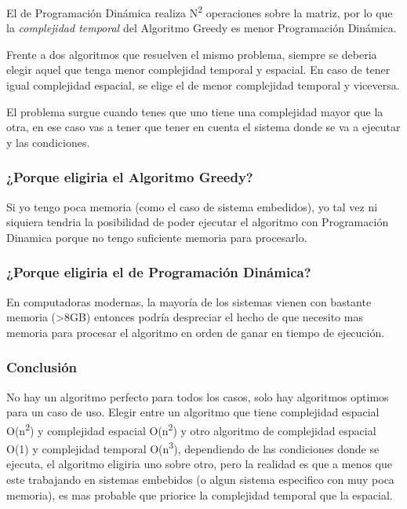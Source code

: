 \documentclass[titlepage,a4paper]{article}
\begin{document}
El de Programación Dinámica realiza N\textsuperscript{2} operaciones sobre la matriz, por lo que
la \emph{complejidad temporal} del Algoritmo Greedy es menor Programación Dinámica.

Frente a dos algoritmos que resuelven el mismo problema, siempre se deberia
elegir aquel que tenga menor complejidad temporal y espacial. En caso de tener
igual complejidad espacial, se elige el de menor complejidad temporal y
viceversa.

El problema surgue cuando tenes que uno tiene una complejidad mayor que la otra,
en ese caso vas a tener que tener en cuenta el sistema donde se va a ejecutar y
las condiciones.

\subsubsection{¿Porque eligiria el Algoritmo Greedy?}
\label{sec:org17f62a5}
Si yo tengo poca memoria (como el caso de sistema embedidos), yo tal vez ni
siquiera tendria la posibilidad de poder ejecutar el algoritmo con Programación
Dinamica porque no tengo suficiente memoria para procesarlo.

\subsubsection{¿Porque eligiria el de Programación Dinámica?}
\label{sec:org1213c1f}
En computadoras modernas, la mayoría de los sistemas vienen con bastante memoria
(>8GB) entonces podría despreciar el hecho de que necesito mas memoria para
procesar el algoritmo en orden de ganar en tiempo de ejecución.

\subsubsection{Conclusión}
\label{sec:orga19eebd}
No hay un algoritmo perfecto para todos los casos, solo hay algoritmos optimos
para un caso de uso. Elegir entre un algoritmo que tiene complejidad espacial
O(n\textsuperscript{2}) y complejidad espacial O(n\textsuperscript{2}) y otro algoritmo de complejidad espacial
O(1) y complejidad temporal O(n\textsuperscript{3}), dependiendo de las condiciones donde se
ejecuta, el algoritmo eligiria uno sobre otro, pero la realidad es que a menos
que este trabajando en sistemas embebidos (o algun sistema especifico con muy
poca memoria), es mas probable que priorice la complejidad temporal que la
espacial.
\end{document}
